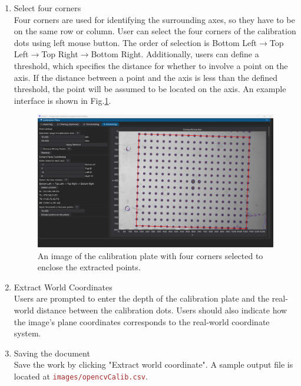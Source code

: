 \documentclass[a4paper,fleqn]{article}
\newcommand{\file}[1]{\textcolor{brown}{\texttt{#1}}}
\begin{document}
\begin{enumerate}
\begin{enumerate}
\begin{enumerate}
        \item Select four corners\\
        Four corners are used for identifying the surrounding axes, so they have to be on the same row or column. User can select the four corners of the calibration dots using left mouse button. The order of selection is Bottom Left$\rightarrow$Top Left$\rightarrow$Top Right$\rightarrow$Bottom Right.
        Additionally, users can define a threshold, which specifies the distance for whether to involve a point on the axis. If the distance between a point and the axis is less than the defined threshold, the point will be assumed to be located on the axis. 
        An example interface is shown in Fig.\ref{fig:GUI_calibplate_extract}.
        \begin{figure}[h]
            \centering
            \includegraphics[width=\linewidth]{Fig/GUI_calibplate_extract.png}
            \caption{An image of the calibration plate with four corners selected to enclose the extracted points.}
            \label{fig:GUI_calibplate_extract}
        \end{figure}

        \item Extract World Coordinates\\
        Users are prompted to enter the depth of the calibration plate and the real-world distance between the calibration dots. Users should also indicate how the image's plane coordinates corresponds to the real-world coordinate system.

        \item Saving the document\\
        Save the work by clicking "Extract world coordinate". A sample output file is located at \file{images/opencvCalib.csv}.
        
        \end{enumerate}
         
    \end{enumerate}

\end{enumerate}
\end{document}
